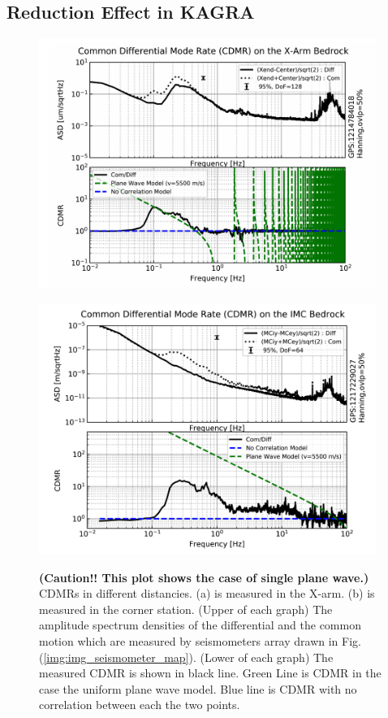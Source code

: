 \subsection{Reduction Effect in KAGRA}

\begin{figure}[H]
  \begin{center}  
    \begin{minipage}{0.5\vsize}
      \includegraphics[width=11.0cm]{../underground_seismic_noise/img_cdmr_xarm.png}    
      \label{img:img_cdmr_xarm}
    \end{minipage}
  \end{center}
  \begin{center}  
    \begin{minipage}{0.5\vsize}
      \includegraphics[width=11.0cm]{../underground_seismic_noise/img_cdmr_imc.png}
      \label{img:img_cdmr_imc}  
    \end{minipage}
  \end{center}      
  \caption{\textbf{(Caution!! This plot shows the case of single plane wave.)} CDMRs in different distancies. (a) is measured in the X-arm. (b) is measured in the corner station. (Upper of each graph) The amplitude spectrum densities of the differential and the common motion which are measured by seismometers array drawn in Fig.(\ref{img:img_seismometer_map}). (Lower of each graph) The measured CDMR is shown in black line. Green Line is CDMR in the case the uniform plane wave model. Blue line is CDMR with no correlation between each the two points.}
\end{figure}


